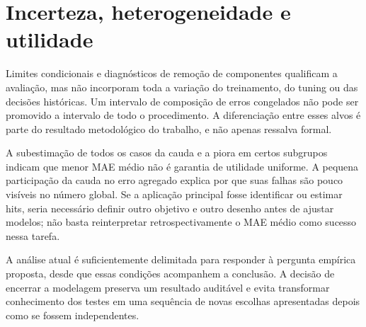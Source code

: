 \section{Incerteza, heterogeneidade e utilidade}
Limites condicionais e diagnósticos de remoção de componentes qualificam a avaliação, mas não incorporam toda a variação do treinamento, do tuning ou das decisões históricas. Um intervalo de composição de erros congelados não pode ser promovido a intervalo de todo o procedimento. A diferenciação entre esses alvos é parte do resultado metodológico do trabalho, e não apenas ressalva formal.

A subestimação de todos os casos da cauda e a piora em certos subgrupos indicam que menor MAE médio não é garantia de utilidade uniforme. A pequena participação da cauda no erro agregado explica por que suas falhas são pouco visíveis no número global. Se a aplicação principal fosse identificar ou estimar hits, seria necessário definir outro objetivo e outro desenho antes de ajustar modelos; não basta reinterpretar retrospectivamente o MAE médio como sucesso nessa tarefa.

A análise atual é suficientemente delimitada para responder à pergunta empírica proposta, desde que essas condições acompanhem a conclusão. A decisão de encerrar a modelagem preserva um resultado auditável e evita transformar conhecimento dos testes em uma sequência de novas escolhas apresentadas depois como se fossem independentes.
